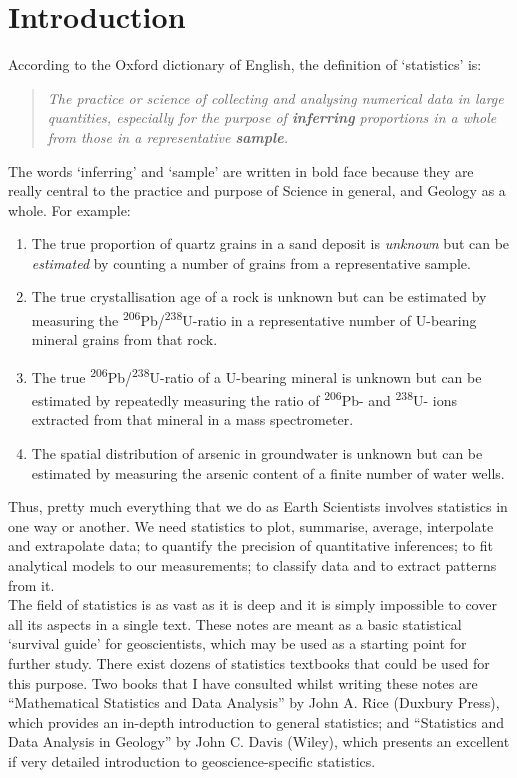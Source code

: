 \chapter{Introduction}
\label{ch:introduction}

According to the Oxford dictionary of English, the definition of
`statistics' is:

\begin{quote}
  \textit{The practice or science of collecting and analysing
    numerical data in large quantities, especially for the purpose of
    \textbf{inferring} proportions in a whole from those in a
    representative \textbf{sample}.}
\end{quote}

The words `inferring' and `sample' are written in bold face because
they are really central to the practice and purpose of Science in
general, and Geology as a whole. For example:

\begin{enumerate}
\item The true proportion of quartz grains in a sand deposit is
  \emph{unknown} but can be \emph{estimated} by counting a number of
  grains from a representative sample.
\item The true crystallisation age of a rock is unknown but can be
  estimated by measuring the
  \textsuperscript{206}Pb/\textsuperscript{238}U-ratio in a
  representative number of U-bearing mineral grains from that rock.
\item The true \textsuperscript{206}Pb/\textsuperscript{238}U-ratio of
  a U-bearing mineral is unknown but can be estimated by repeatedly
  measuring the ratio of \textsuperscript{206}Pb- and
  \textsuperscript{238}U- ions extracted from that mineral in a mass
  spectrometer.
\item The spatial distribution of arsenic in groundwater is unknown
  but can be estimated by measuring the arsenic content of a finite
  number of water wells.
\end{enumerate}

Thus, pretty much everything that we do as Earth Scientists involves
statistics in one way or another. We need statistics to plot,
summarise, average, interpolate and extrapolate data; to quantify the
precision of quantitative inferences; to fit analytical models to our
measurements; to classify data and to extract patterns from it.\\

The field of statistics is as vast as it is deep and it is simply
impossible to cover all its aspects in a single text. These notes are
meant as a basic statistical `survival guide' for geoscientists, which
may be used as a starting point for further study. There exist dozens
of statistics textbooks that could be used for this purpose. Two books
that I have consulted whilst writing these notes are ``Mathematical
Statistics and Data Analysis'' by John A. Rice (Duxbury Press), which
provides an in-depth introduction to general statistics; and
``Statistics and Data Analysis in Geology'' by John C. Davis (Wiley),
which presents an excellent if very detailed introduction to
geoscience-specific statistics.\\

